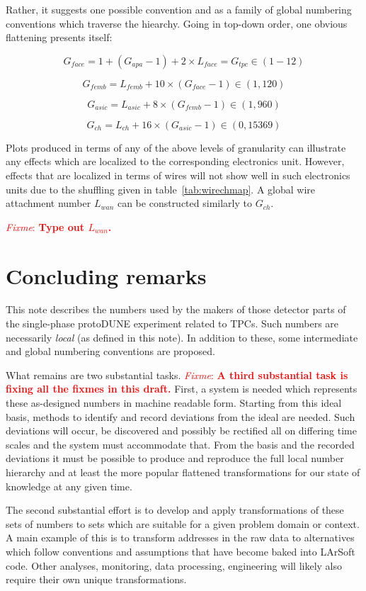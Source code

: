 \documentclass[pdftex,12pt,letter]{article}
\newcommand{\fixme}[1]{\textcolor{red}{\textit{Fixme}: \textbf{#1}}}
\begin{document}
Rather, it suggests one possible convention and as a family of global
numbering conventions which traverse the hiearchy.  Going in top-down
order, one obvious flattening presents itself:

\[  G_{face} = 1 + (G_{apa}-1) + 2\times L_{face} = G_{tpc} \in (1-12) \]
  
\[  G_{femb} = L_{femb} + 10\times (G_{face}-1) \in (1,120) \]

\[  G_{asic} = L_{asic} + 8\times (G_{femb}-1) \in (1,960) \]

\[ G_{ch} = L_{ch} + 16\times (G_{asic}-1) \in (0,15369) \]

Plots produced in terms of any of the above levels of granularity can
illustrate any effects which are localized to the corresponding
electronics unit.  However, effects that are localized in terms of
wires will not show well in such electronics units due to the
shuffling given in table~\ref{tab:wirechmap}.  A global wire
attachment number $L_{wan}$ can be constructed similarly to $G_{ch}$.

\fixme{Type out $L_{wan}$.}

\section{Concluding remarks}

This note describes the numbers used by the makers of those detector
parts of the single-phase protoDUNE experiment related to TPCs.  Such
numbers are necessarily \textit{local} (as defined in this note).  In
addition to these, some intermediate and global numbering conventions
are proposed.

What remains are two substantial tasks.  \fixme{A third substantial
  task is fixing all the fixmes in this draft.}  First, a system is
needed which represents these as-designed numbers in machine readable
form.  Starting from this ideal basis, methods to identify and record
deviations from the ideal are needed.  Such deviations will occur, be
discovered and possibly be rectified all on differing time scales and
the system must accommodate that.  From the basis and the recorded
deviations it must be possible to produce and reproduce the full local
number hierarchy and at least the more popular flattened
transformations for our state of knowledge at any given time.

The second substantial effort is to develop and apply transformations
of these sets of numbers to sets which are suitable for a given
problem domain or context.  A main example of this is to transform
addresses in the raw data to alternatives which follow conventions and
assumptions that have become baked into LArSoft code.  Other analyses,
monitoring, data processing, engineering will likely also require
their own unique transformations.
\end{document}
